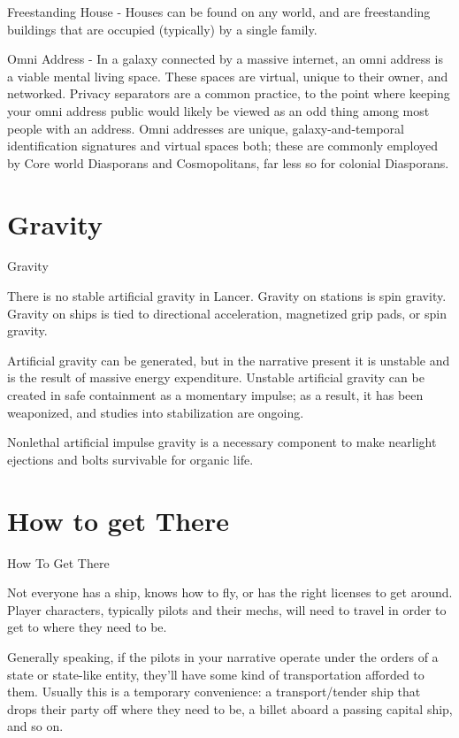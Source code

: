 Freestanding House - Houses can be found on any world, and are freestanding buildings that are  
occupied (typically) by a single family. 
 

Omni Address - In a galaxy connected by a massive internet, an omni address is a viable mental  
living space. These spaces are virtual, unique to their owner, and networked. Privacy separators  
are a common practice, to the point where keeping your omni address public would likely be  
viewed as an odd thing among most people with an address. Omni addresses are unique,  
galaxy-and-temporal identification signatures and virtual spaces both; these are commonly  
employed by Core world Diasporans and Cosmopolitans, far less so for colonial Diasporans. 
 

                                                                                                                     

\section{Gravity}
Gravity  

There is no stable artificial gravity in Lancer. Gravity on stations is spin gravity. Gravity on ships is  
tied to directional acceleration, magnetized grip pads, or spin gravity. 
 

Artificial gravity can be generated, but in the narrative present it is unstable and is the result of  
massive energy expenditure. Unstable artificial gravity can be created in safe containment as a  
momentary impulse; as a result, it has been weaponized, and studies into stabilization are  
ongoing. 
 

Nonlethal artificial impulse gravity is a necessary component to make nearlight ejections and  
bolts survivable for organic life.   
\section{How to get There}
How To Get There  

Not everyone has a ship, knows how to fly, or has the right licenses to get around. Player  
characters, typically pilots and their mechs, will need to travel in order to get to where they need  
to be. 
 

Generally speaking, if the pilots in your narrative operate under the orders of a state or state-like  
entity, they’ll have some kind of transportation afforded to them. Usually this is a temporary  
convenience: a transport/tender ship that drops their party off where they need to be, a billet  
aboard a passing capital ship, and so on. 
 

